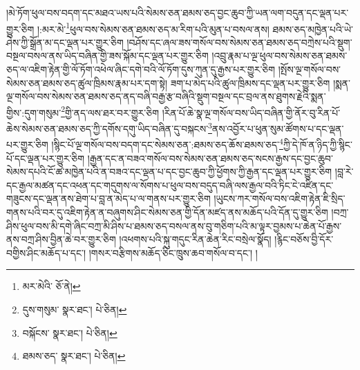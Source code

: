 །མེ་ཏོག་ཕུལ་བས་བདག་དང་མཐའ་ཡས་པའི་སེམས་ཅན་ཐམས་ཅད་བྱང་ཆུབ་ཀྱི་ཡན་ལག་བདུན་དང་ལྡན་པར་གྱུར་ཅིག །:མར་མེ་\footnote{མར་མེའི་  ཅོ་ནེ། }ཕུལ་བས་སེམས་ཅན་ཐམས་ཅད་མ་རིག་པའི་མུན་པ་བསལ་ནས། ཐམས་ཅད་མཁྱེན་པའི་ཡེ་ཤེས་ཀྱི་སྒྲོན་མ་དང་ལྡན་པར་གྱུར་ཅིག །བཤོས་དང་ཞལ་ཟས་གསོལ་བས་སེམས་ཅན་ཐམས་ཅད་བཀྲེས་པའི་སྡུག་བསྔལ་བསལ་ནས་ཡིད་བཞིན་གྱི་ཟས་སྐོམ་དང་ལྡན་པར་གྱུར་ཅིག །འབྲུ་རྣམ་པ་ལྔ་ཕུལ་བས་སེམས་ཅན་ཐམས་ཅད་ལ་འཇིག་རྟེན་གྱི་ལོ་ཏོག་འཕེལ་ཞིང་དགེ་བའི་ལོ་ཏོག་དུས་ཀུན་དུ་རྒྱས་པར་གྱུར་ཅིག །སྤོས་ལྔ་གསོལ་བས་སེམས་ཅན་ཐམས་ཅད་ཚུལ་ཁྲིམས་རྣམ་པར་དག་སྟེ། ཟག་པ་མེད་པའི་ཚུལ་ཁྲིམས་དང་ལྡན་པར་གྱུར་ཅིག །སྨན་ལྔ་གསོལ་བས་སེམས་ཅན་ཐམས་ཅད་ནད་བཞི་བརྒྱ་རྩ་བཞིའི་སྡུག་བསྔལ་དང་བྲལ་ནས་ཐུགས་རྗེའི་སྨན་གྱིས་:དུག་གསུམ་\footnote{དུས་གསུམ་  སྣར་ཐང་།  པེ་ཅིན། }གྱི་ནད་ལས་ཐར་བར་གྱུར་ཅིག །རིན་པོ་ཆེ་སྣ་ལྔ་གསོལ་བས་ཡིད་བཞིན་གྱི་ནོར་བུ་རིན་པོ་ཆེས་སེམས་ཅན་ཐམས་ཅད་ཀྱི་དགོས་དགུ་ཡིད་བཞིན་དུ་བསྐངས་\footnote{བསྐོངས་  སྣར་ཐང་།  པེ་ཅིན། }ནས་འབྱོར་པ་ཕུན་སུམ་ཚོགས་པ་དང་ལྡན་པར་གྱུར་ཅིག །སྙིང་པོ་ལྔ་གསོལ་བས་བདག་དང་སེམས་ཅན་:ཐམས་ཅད་ཆོས་ཐམས་ཅད་\footnote{ཐམས་ཅད་  སྣར་ཐང་།  པེ་ཅིན། }ཀྱི་དེ་ཁོ་ན་ཉིད་ཀྱི་སྙིང་པོ་དང་ལྡན་པར་གྱུར་ཅིག །རྒྱན་དང་ན་བཟའ་གསོལ་བས་སེམས་ཅན་ཐམས་ཅད་སངས་རྒྱས་དང་བྱང་ཆུབ་སེམས་དཔའི་ངོ་ཚ་མཁྱེན་པའི་ན་བཟའ་དང་ལྡན་པ་དང་བྱང་ཆུབ་ཀྱི་ཕྱོགས་ཀྱི་རྒྱན་དང་ལྡན་པར་གྱུར་ཅིག །བླ་རེ་དང་རྒྱལ་མཚན་དང་འཕན་དང་གདུགས་ལ་སོགས་པ་ཕུལ་བས་བདུད་བཞི་ལས་རྒྱལ་བའི་ཏིང་ངེ་འཛིན་དང་གཟུངས་དང་ལྡན་ནས་ཐེག་པ་བླ་ན་མེད་པ་ལ་གནས་པར་གྱུར་ཅིག །ཡུངས་ཀར་གསོལ་བས་འཇིག་རྟེན་ཇི་སྲིད་གནས་པའི་བར་དུ་འཇིག་རྟེན་ན་བཞུགས་ཤིང་སེམས་ཅན་གྱི་དོན་མཛད་ནས་མཆོད་པའི་དོན་དུ་གྱུར་ཅིག །བཀྲ་ཤིས་ཕུལ་བས་མི་དགེ་ཞིང་བཀྲ་མི་ཤིས་པ་ཐམས་ཅད་བསལ་ནས་བུ་གཅིག་པའི་མ་ལྟར་བྱམས་པ་ཆེན་པོ་རྒྱས་ནས་བཀྲ་ཤིས་བྱིན་ཆེ་བར་གྱུར་ཅིག །འཕགས་པའི་སྐུ་གདུང་རིན་ཆེན་རིང་བསྲེལ་སྣོད། །རྙིང་བཅོས་བྱི་དོར་བགྱིས་ཤིང་མཆོད་པ་དང་། །གསར་བརྩིགས་མཆོད་ཅིང་ཁྲུས་ཆབ་གསོལ་བ་དང་། །
